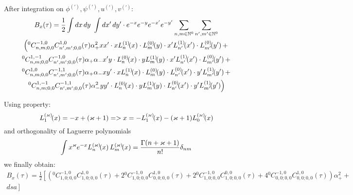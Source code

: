 \documentclass[12pt, notitlepage]{report}
\begin{document}
After integration on $\phi^{(')}, \psi^{(')}, u^{(')}, v^{(')}$:
\begin{multline}
	B_x(\tau) = \frac{1}{2} \int dx\, dy\ \int dx'\, dy' \cdot e^{-x}e^{-y}e^{-x'}e^{-y'}\sum\limits_{n,m\in \mathbb{N}^0}\sum\limits_{n',m'\in \mathbb{N}^0} \\
	\left( {}^0C^{-1, 0}_{n,m; 0, 0} C^{1, 0}_{n',m'; 0,0}(\tau)\alpha_+^2 xx' \cdot x\Lagg{n}{1}{x} \cdot \Lagg{m}{0}{y}\cdot x'\Lagg{n'}{1}{x'} \cdot \Lagg{m'}{0}{y'} + \right.\\
	\left. {}^0C^{1, -1}_{n,m; 0, 0} C^{-1, 0}_{n',m'; 0,0}(\tau)\alpha_+\alpha_- x'y \cdot \Lagg{n}{0}{x} \cdot y\Lagg{m}{1}{y}\cdot x'\Lagg{n'}{1}{x'} \cdot \Lagg{m'}{0}{y'} + \right.\\
	\left.  {}^0C^{1, 0}_{n,m; 0, 0} C^{-1, 1}_{n',m'; 0,0}(\tau)\alpha_+\alpha_- xy' \cdot x\Lagg{n}{1}{x} \cdot \Lagg{m}{0}{y}\cdot \Lagg{n'}{0}{x'} \cdot y'\Lagg{m'}{1}{y'} + \right.\\
	\left. {}^0C^{1, -1}_{n,m; 0, 0} C^{-1, 1}_{n',m'; 0,0}(\tau)\alpha_-^2 yy' \cdot \Lagg{n}{0}{x} \cdot y\Lagg{m}{1}{y}\cdot \Lagg{n'}{0}{x'} \cdot y'\Lagg{m'}{1}{y'} \right)
\end{multline}

Using property:
$$
L_{1}^{(\varkappa)}\!\!\left(x\right) = -x + (\varkappa+1) => x = -L_{1}^{(\varkappa)}\!\!\left(x\right) - (\varkappa+1)L_{0}^{(\varkappa)}\!\!\left(x\right)
$$
and orthogonality of Laguerre polynomials
$$
\int x^\varkappa e^{-x} L_{n}^{(\varkappa)}\!\!\left(x\right)L_{m}^{(\varkappa)}\!\!\left(x\right) = \frac{\Gamma(n+\varkappa+1)}{n!}\delta_{nm}
$$
we finally obtain:
\begin{multline}
	B_x(\tau) = \frac{1}{2} \left[ \left( {}^0C^{-1, 0}_{1,0; 0, 0} C^{1, 0}_{1,0; 0,0}(\tau) + 2{}^0C^{-1, 0}_{1,0; 0, 0} C^{1, 0}_{0,0; 0,0}(\tau) + 2{}^0C^{-1, 0}_{1,0; 0, 0} C^{0, 0}_{1,0; 0,0}(\tau) + 4{}^0C^{-1, 0}_{0,0; 0, 0} C^{1, 0}_{0,0; 0,0}(\tau) \right)\alpha_+^2  + \right.\\
	\left. dsa \right]
\end{multline}
\end{document}

